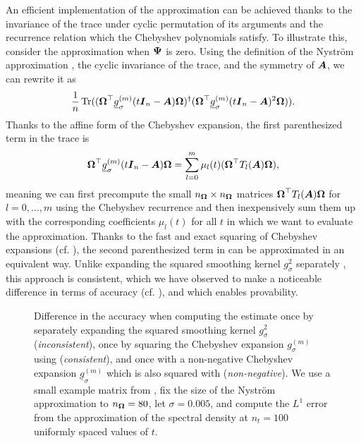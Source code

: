\documentclass[12pt]{article}
\begin{document}
An efficient implementation of the approximation  can be achieved thanks to the invariance of the trace under cyclic permutation of its arguments and the recurrence relation  which the Chebyshev polynomials satisfy. To illustrate this, consider the approximation  when $\boldsymbol{\Psi}$ is zero. Using the definition of the Nyström approximation , the cyclic invariance of the trace, and the symmetry of $\boldsymbol{A}$, we can rewrite it as
\begin{equation}
    \frac{1}{n} \operatorname{Tr}((\boldsymbol{\Omega}^{\top} \underline{g}^{(m)}_{\sigma}(t \boldsymbol{I}_n - \boldsymbol{A}) \boldsymbol{\Omega})^{\dagger} (\boldsymbol{\Omega}^{\top} \underline{g}^{(m)}_{\sigma}(t \boldsymbol{I}_n - \boldsymbol{A})^2 \boldsymbol{\Omega})).
    \label{equ:cyclic-property}
\end{equation}
Thanks to the affine form of the Chebyshev expansion, the first parenthesized term in the trace is
\begin{equation}
    \boldsymbol{\Omega}^{\top} \underline{g}^{(m)}_{\sigma}(t \boldsymbol{I}_n - \boldsymbol{A}) \boldsymbol{\Omega} = \sum_{l=0}^{m} \mu_l(t) (\boldsymbol{\Omega}^{\top} T_l(\boldsymbol{A}) \boldsymbol{\Omega}),
\end{equation}
meaning we can first precompute the small $n_{\boldsymbol{\Omega}} \times n_{\boldsymbol{\Omega}}$ matrices $\boldsymbol{\Omega}^{\top} T_l(\boldsymbol{A}) \boldsymbol{\Omega}$ for $l=0, \dots, m$ using the Chebyshev recurrence  and then inexpensively sum them up with the corresponding coefficients $\mu_l(t)$ for all $t$ in which we want to evaluate the approximation. Thanks to the fast and exact squaring of Chebyshev expansions (cf. ), the second parenthesized term in  can be approximated in an equivalent way. Unlike expanding the squared smoothing kernel $g_{\sigma}^2$ separately \cite{lin-2017-randomized-estimation}, this approach is consistent, which we have observed to make a noticeable difference in terms of accuracy (cf. ), and which enables provability. 

\begin{figure}[ht]
    \centering
    
    \caption{Difference in the accuracy when computing the estimate  once by separately expanding the squared smoothing kernel $g_{\sigma}^2$ (\emph{inconsistent}), once by squaring the Chebyshev expansion $g_{\sigma}^{(m)}$ using  (\emph{consistent}), and once with a non-negative Chebyshev expansion $\underline{g}_{\sigma}^{(m)}$  which is also squared with  (\emph{non-negative}). We use a small example matrix from , fix the size of the Nyström approximation to $n_{\boldsymbol{\Omega}} = 80$, let $\sigma = 0.005$, and compute the $L^1$ error from the approximation of the spectral density at $n_t = 100$ uniformly spaced values of $t$.}
    \label{fig:interpolation-issue}
\end{figure}
\end{document}
